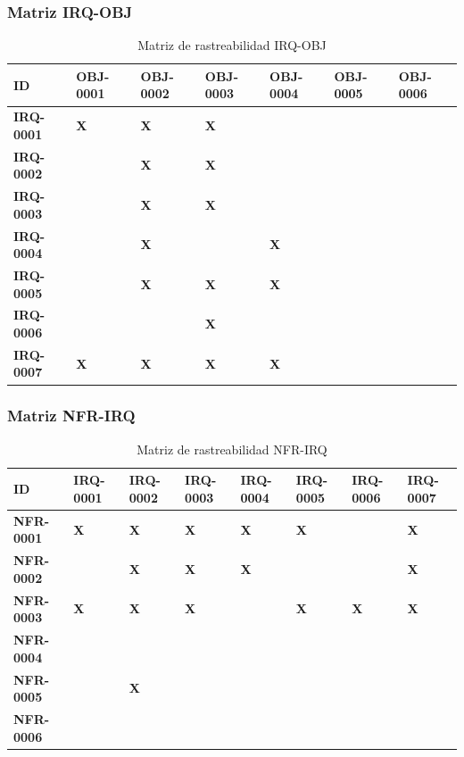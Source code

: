 
\subsubsection{Matriz IRQ-OBJ}

\begin{table}[H]
\centering
\small
\begin{tabular}{p{1.5cm}p{0.5cm}p{0.5cm}p{0.5cm}p{0.5cm}p{0.5cm}p{0.5cm}}
\hline
\textbf{ID} & \textbf{OBJ-0001} & \textbf{OBJ-0002} & \textbf{OBJ-0003} & \textbf{OBJ-0004} & \textbf{OBJ-0005} & \textbf{OBJ-0006} \\
\hline
\textbf{IRQ-0001} & \textbf{X} & \textbf{X} & \textbf{X} &  &  &  \\
\textbf{IRQ-0002} &  & \textbf{X} & \textbf{X} &  &  &  \\
\textbf{IRQ-0003} &  & \textbf{X} & \textbf{X} &  &  &  \\
\textbf{IRQ-0004} &  & \textbf{X} &  & \textbf{X} &  &  \\
\textbf{IRQ-0005} &  & \textbf{X} & \textbf{X} & \textbf{X} &  &  \\
\textbf{IRQ-0006} &  &  & \textbf{X} &  &  &  \\
\textbf{IRQ-0007} & \textbf{X} & \textbf{X} & \textbf{X} & \textbf{X} &  &  \\
\hline
\end{tabular}
\caption{Matriz de rastreabilidad IRQ-OBJ}
\label{fig:matriz-irq-obj}
\end{table}


\subsubsection{Matriz NFR-IRQ}

\begin{table}[H]
\centering
\small
\begin{tabular}{p{1.5cm}p{0.5cm}p{0.5cm}p{0.5cm}p{0.5cm}p{0.5cm}p{0.5cm}p{0.5cm}}
\hline
\textbf{ID} & \textbf{IRQ-0001} & \textbf{IRQ-0002} & \textbf{IRQ-0003} & \textbf{IRQ-0004} & \textbf{IRQ-0005} & \textbf{IRQ-0006} & \textbf{IRQ-0007} \\
\hline
\textbf{NFR-0001} & \textbf{X} & \textbf{X} & \textbf{X} & \textbf{X} & \textbf{X} &  & \textbf{X} \\
\textbf{NFR-0002} &  & \textbf{X} & \textbf{X} & \textbf{X} &  &  & \textbf{X} \\
\textbf{NFR-0003} & \textbf{X} & \textbf{X} & \textbf{X} &  & \textbf{X} & \textbf{X} & \textbf{X} \\
\textbf{NFR-0004} &  &  &  &  &  &  &  \\
\textbf{NFR-0005} &  & \textbf{X} &  &  &  &  &  \\
\textbf{NFR-0006} &  &  &  &  &  &  &  \\
\hline
\end{tabular}
\caption{Matriz de rastreabilidad NFR-IRQ}
\label{fig:matriz-nfr-irq}
\end{table}


